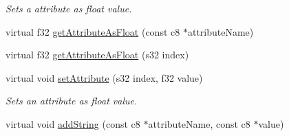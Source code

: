 \begin{DoxyCompactItemize}
\begin{DoxyCompactList}\small\item\em Sets a attribute as float value. \end{DoxyCompactList}\item 
virtual f32 \hyperlink{classirr_1_1io_1_1_c_attributes_a1a79c2194792e07764ad381ea8729dba}{get\-Attribute\-As\-Float} (const c8 $\ast$attribute\-Name)
\item 
virtual f32 \hyperlink{classirr_1_1io_1_1_c_attributes_aacbc0a4ae761cf6156c8a08d2039870f}{get\-Attribute\-As\-Float} (s32 index)
\item 
virtual void \hyperlink{classirr_1_1io_1_1_c_attributes_a0063ee8c8490cd0abd4cdcda53e834ca}{set\-Attribute} (s32 index, f32 value)
\begin{DoxyCompactList}\small\item\em Sets an attribute as float value. \end{DoxyCompactList}\item 
\hypertarget{classirr_1_1io_1_1_c_attributes_a1590291112302c3dea3b26001be14344}{virtual void \hyperlink{classirr_1_1io_1_1_c_attributes_a1590291112302c3dea3b26001be14344}{add\-String} (const c8 $\ast$attribute\-Name, const c8 $\ast$value)}\label{classirr_1_1io_1_1_c_attributes_a1590291112302c3dea3b26001be14344}


\end{DoxyCompactItemize}
